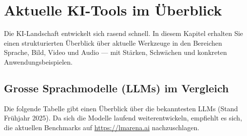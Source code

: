 \chapter{Aktuelle KI-Tools im Überblick}\label{ch:K03_Tools}

\begin{myremark}
Die KI-Landschaft entwickelt sich rasend schnell. In diesem Kapitel erhalten Sie
einen strukturierten Überblick über aktuelle Werkzeuge in den Bereichen Sprache,
Bild, Video und Audio --- mit Stärken, Schwächen und konkreten Anwendungsbeispielen.
\end{myremark}

\section{Grosse Sprachmodelle (LLMs) im Vergleich}

Die folgende Tabelle gibt einen Überblick über die bekanntesten LLMs (Stand Frühjahr
2025). Da sich die Modelle laufend weiterentwickeln, empfiehlt es sich, die aktuellen
Benchmarks auf \url{https://lmarena.ai} nachzuschlagen.

